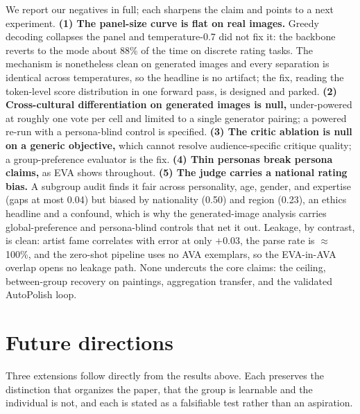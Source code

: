 \documentclass[10pt,twocolumn,letterpaper]{article}
\begin{document}
We report our negatives in full; each sharpens the claim and points to a next experiment. \textbf{(1) The panel-size curve is flat on real images.} Greedy decoding collapses the panel and temperature-0.7 did not fix it: the backbone reverts to the mode about 88\% of the time on discrete rating tasks. The mechanism is nonetheless clean on generated images and every separation is identical across temperatures, so the headline is no artifact; the fix, reading the token-level score distribution in one forward pass, is designed and parked. \textbf{(2) Cross-cultural differentiation on generated images is null,} under-powered at roughly one vote per cell and limited to a single generator pairing; a powered re-run with a persona-blind control is specified. \textbf{(3) The critic ablation is null on a generic objective,} which cannot resolve audience-specific critique quality; a group-preference evaluator is the fix. \textbf{(4) Thin personas break persona claims,} as EVA shows throughout. \textbf{(5) The judge carries a national rating bias.} A subgroup audit \citep{aesbiasbench2025} finds it fair across personality, age, gender, and expertise (gaps at most 0.04) but biased by nationality (0.50) and region (0.23), an ethics headline and a confound, which is why the generated-image analysis carries global-preference and persona-blind controls that net it out. Leakage, by contrast, is clean: artist fame correlates with error at only $+0.03$, the parse rate is $\approx$100\%, and the zero-shot pipeline uses no AVA exemplars, so the EVA-in-AVA overlap opens no leakage path. None undercuts the core claims: the ceiling, between-group recovery on paintings, aggregation transfer, and the validated AutoPolish loop.


\section{Future directions}
\label{sup:future}
Three extensions follow directly from the results above. Each preserves the distinction that organizes the paper, that the group is learnable and the individual is not, and each is stated as a falsifiable test rather than an aspiration.
\end{document}
